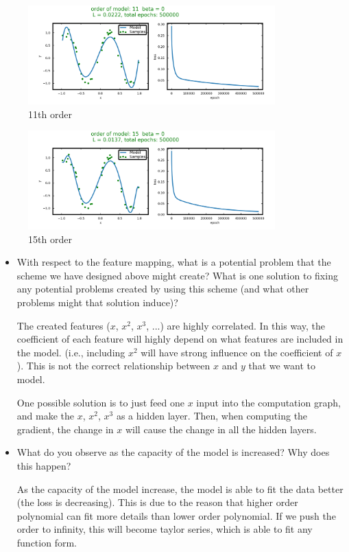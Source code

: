 \begin{figure}[H]
\centering
  \includegraphics[width=0.85\textwidth]{fig/prob2/degree_11_beta_0_loss.png}
\centering 
\caption{11th order}
\label{fig:11th}
\end{figure}
\begin{figure}[H]
\centering
  \includegraphics[width=0.85\textwidth]{fig/prob2/degree_15_beta_0_loss.png}
\centering 
\caption{15th order}
\label{fig:15th}
\end{figure}


\begin{itemize}
\item With respect to the feature mapping, what is a potential problem that the scheme we have designed above might create?
What is one solution to fixing any potential problems created by using this scheme (and what other problems might that solution induce)?

The created features ($x$, $x^2$, $x^3$, ...) are highly correlated. In this way, the coefficient of each feature will highly depend on what features are included in the model. (i.e., including $x^2$ will have strong influence on the coefficient of $x$). This is not the correct relationship between $x$ and $y$ that we want to model.

One possible solution is to just feed one $x$ input into the computation graph, and make the $x$, $x^2$, $x^3$ as a hidden layer. Then, when computing the gradient, the change in $x$ will cause the change in all the hidden layers.

\item What do you observe as the capacity of the model is increased? Why does this happen? 

As the capacity of the model increase, the model is able to fit the data better (the loss is decreasing). This is due to the reason that higher order polynomial can fit more details than lower order polynomial. If we push the order to infinity, this will become taylor series, which is able to fit any function form.

\end{itemize}

